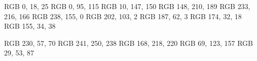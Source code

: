 

\definecolor{richBlackFOGRA}  {RGB} {  0,  18,  25}
\definecolor{blueSapphire}    {RGB} {  0,  95, 115}
\definecolor{viridianGreen}   {RGB} { 10, 147, 150}
\definecolor{middleBlueGreen} {RGB} {148, 210, 189}
\definecolor{mediumChampagne} {RGB} {233, 216, 166}
\definecolor{gamboge}         {RGB} {238, 155,   0}
\definecolor{alloyOrange}     {RGB} {202, 103,   2}
\definecolor{mahogany}        {RGB} {187,  62,   3}
\definecolor{rufous}          {RGB} {174,  32,  18}
\definecolor{rubyRed}         {RGB} {155,  34,  38}


\definecolor{imperialRed}  {RGB} {230,  57,  70}
\definecolor{honeydew}     {RGB} {241, 250, 238}
\definecolor{powderBlue}   {RGB} {168, 218, 220}
\definecolor{celadonBlue}  {RGB} { 69, 123, 157}
\definecolor{prussianBlue} {RGB} { 29,  53,  87}
